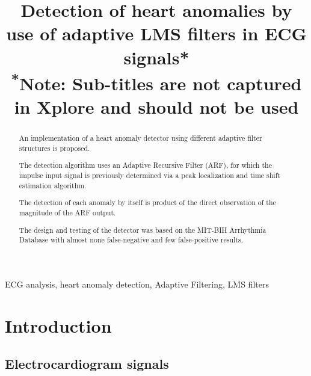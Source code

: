 \documentclass[conference]{IEEEtran}
\begin{document}
\title{Detection of heart anomalies by use of adaptive LMS filters in ECG signals*\\
{\footnotesize \textsuperscript{*}Note: Sub-titles are not captured in Xplore and
should not be used}
}

\author{
\and
{}
}

\maketitle

\begin{abstract}
An implementation of a heart anomaly detector using different adaptive filter structures is proposed.\par
The detection algorithm uses an Adaptive Recursive Filter (ARF), for which the impulse input signal is previously determined via a peak localization and time shift estimation algorithm. \par
The detection of each anomaly by itself is product of the direct observation of the magnitude of the ARF output.\par
The design and testing of the detector was based on the MIT-BIH Arrhythmia Database with almost none false-negative and few false-positive results.
\end{abstract}

\begin{IEEEkeywords}
ECG analysis, heart anomaly detection, Adaptive Filtering, LMS filters
\end{IEEEkeywords}


\section{Introduction}


\subsection{Electrocardiogram signals}
\end{document}
